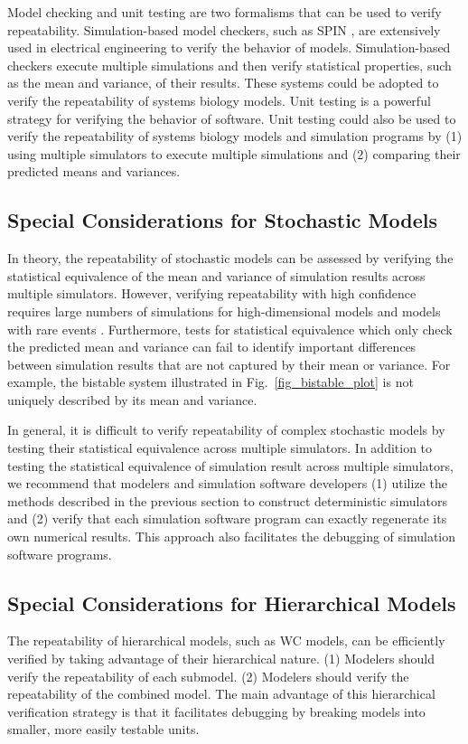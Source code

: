 \documentclass[journal,transmag,twoside]{IEEEtran}
\begin{document}
Model checking and unit testing are two formalisms that can be used to verify repeatability. Simulation-based model checkers, such as SPIN \cite{holzmann1997model}, are extensively used in electrical engineering to verify the behavior of models. Simulation-based checkers execute multiple simulations and then verify statistical properties, such as the mean and variance, of their results. These systems could be adopted to verify the repeatability of systems biology models. Unit testing is a powerful strategy for verifying the behavior of software. Unit testing could also be used to verify the repeatability of systems biology models and simulation programs by (1) using multiple simulators to execute multiple simulations and (2) comparing their predicted means and variances.

\subsection{Special Considerations for Stochastic Models}
In theory, the repeatability of stochastic models can be assessed by verifying the statistical equivalence of the mean and variance of simulation results across multiple simulators. However, verifying repeatability with high confidence requires large numbers of simulations for high-dimensional models and models with rare events \cite{kim2013nonlinear}. Furthermore, tests for statistical equivalence which only check the predicted mean and variance can fail to identify important differences between simulation results that are not captured by their mean or variance. For example, the bistable system illustrated in Fig.~\ref{fig_bistable_plot} is not uniquely described by its mean and variance. 

In general, it is difficult to verify repeatability of complex stochastic models by testing their statistical equivalence across multiple simulators. In addition to testing the statistical equivalence of simulation result across multiple simulators, we recommend that modelers and simulation software developers (1) utilize the methods described in the previous section to construct deterministic simulators and (2) verify that each simulation software program can exactly regenerate its own numerical results. This approach also facilitates the debugging of simulation software programs.

\subsection{Special Considerations for Hierarchical Models}
The repeatability of hierarchical models, such as WC models, can be efficiently verified by taking advantage of their hierarchical nature. (1) Modelers should verify the repeatability of each submodel. (2) Modelers should verify the repeatability of the combined model. The main advantage of this hierarchical verification strategy is that it facilitates debugging by breaking models into smaller, more easily testable units. 
\end{document}
